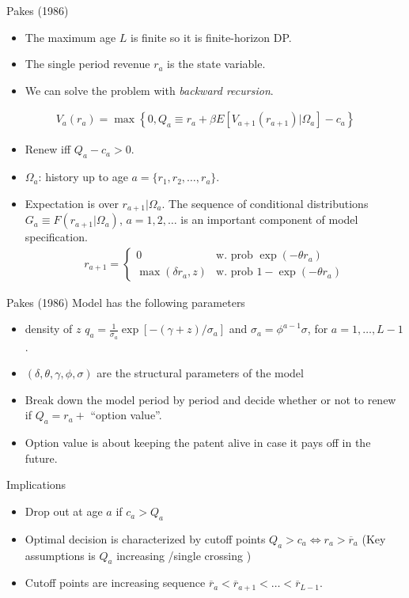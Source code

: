 \documentclass[xcolor=pdftex,dvipsnames,table,mathserif,aspectratio=169]{beamer}
\begin{document}
\begin{frame}{Pakes (1986)}
\begin{itemize}
\item The maximum age $L$ is finite so it is finite-horizon DP.
\item The single period revenue $r_a$ is the state variable.
\item We can solve the problem with \textit{backward recursion}.
\end{itemize}
\begin{eqnarray*}
V_a(r_a) = \max  \left\{0, Q_a \equiv r_a + \beta E[V_{a+1} (r_{a+1} ) | \Omega_a] - c_a  \right\}
\end{eqnarray*}
\vspace{-0.75cm}
\begin{itemize}
\item Renew iff $Q_a - c_a > 0$.
\item $\Omega_a$: history up to age $a = \{r_1,r_2,\ldots,r_a\}$.
\item Expectation is over $r_{a+1} | \Omega_{a}$. The sequence of conditional distributions $G_a \equiv F(r_{a+1} | \Omega_a)$, $a=1,2,\ldots$ is an important component of model specification.
\begin{eqnarray*}
r_{a+1} = \begin{cases} 0  & \mbox{w. prob } \exp(-\theta r_a) \\
\max(\delta r_a,z) & \mbox{w. prob } 1-\exp(-\theta r_a) \end{cases}
\end{eqnarray*}
\end{itemize}
\end{frame}


\begin{frame}{Pakes (1986)}
Model has the following parameters
\begin{itemize}
\item density of $z$ $q_a = \frac{1}{\sigma_a} \exp[-(\gamma+z)/\sigma_a]$ and $\sigma_a = \phi^{a-1} \sigma$, for $a=1,\ldots,L-1$. 
\item $(\delta, \theta, \gamma, \phi, \sigma)$ are the structural parameters of the model
\item Break down the model period by period and decide whether or not to renew if $Q_a = r_a + $ ``option value''.
\item Option value is about keeping the patent alive in case it pays off in the future.
\end{itemize}
Implications
\begin{itemize}
\item Drop out at age $a$ if $c_a > Q_a$
\item Optimal decision is characterized by cutoff points $Q_a > c_a \Leftrightarrow r_a > \overline{r}_a$  (Key assumptions is $Q_a$ increasing /single crossing )
\item Cutoff points are increasing sequence $\overline{r}_{a} < \overline{r}_{a+1} < \ldots < \overline{r}_{L-1}$.
\end{itemize}
\end{frame}
\end{document}
